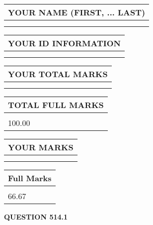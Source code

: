 \documentclass{ctexart}
\begin{document}
   
   
   
\newpage 
\setcounter{page}{ 
   514001 } 
   
   
   
   
\noindent\begin{tabular}{|l|}
\hline
YOUR NAME (FIRST, ... LAST)  \\
\hline
 \\ 
 \\ 
\hline
\end{tabular}
\hspace{0.05in} \begin{tabular}{|l|}
\hline
 YOUR   ID   INFORMATION  \\
\hline
 \\ 
 \\ 
\hline
\end{tabular}
   
   
\vspace{0.2in}\noindent\begin{tabular}{|l|}
\hline
YOUR TOTAL MARKS  \\
\hline
 \\ 
 \\ 
\hline
\end{tabular}
\hspace{0.05in} \begin{tabular}{|l|}
\hline
TOTAL FULL MARKS  \\
\hline
 \\ 
100.00 \\
\hline
\end{tabular}
   
   
 \vspace{0.2in}
 
 
 
 
   
   
  
\vspace{0.2in}
  
\noindent\begin{tabular}{|l|}
\hline
 YOUR MARKS  \\
\hline
 \\ 
 \\ 
\hline
\end{tabular}
\hspace{0.05in} \begin{tabular}{|l|}
\hline
 Full Marks  \\
\hline
 \\ 
66.67 \\
\hline
\end{tabular}
{\textbf{\Large{QUESTION
514.1 
}}}
  
\end{document}
